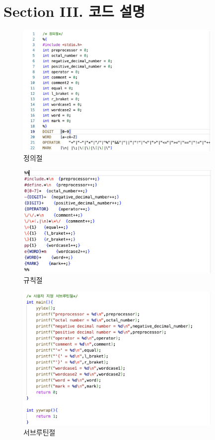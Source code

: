\documentclass{article}
\begin{document}
\section{Section III. 코드 설명}
\begin{figure}[h]
    \centering
    \includegraphics[width = 10cm]{code1.png}
    \caption{정의절}
    \label{fig:fig2}
\end{figure}
\begin{figure}[h]
    \centering
    \includegraphics[width = 10cm]{code2.png}
    \caption{규칙절}
    \label{fig:fig3}
\end{figure}
\begin{figure}[ht]
    \centering
    \includegraphics[width = 10cm]{code3.png}
    \caption{서브루틴절}
    \label{fig:fig4}
\end{figure}
\end{document}
